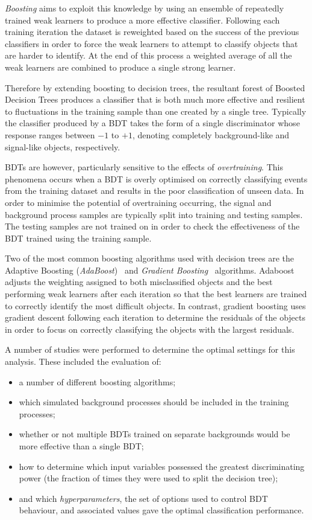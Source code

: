 \emph{Boosting} aims to exploit this knowledge by using an ensemble of repeatedly trained weak learners to produce a more effective classifier.
Following each training iteration the dataset is reweighted based on the success of the previous classifiers in order to force the weak learners to attempt to classify objects that are harder to identify.
At the end of this process a weighted average of all the weak learners are combined to produce a single strong learner.

Therefore by extending boosting to decision trees, the resultant forest of Boosted Decision Trees produces a classifier that is both much more effective and resilient to fluctuations in the training sample than one created by a single tree.
Typically the classifier produced by a BDT takes the form of a single discriminator whose response ranges between $-1$ to $+1$, denoting completely background-like and signal-like objects, respectively.

BDTs are however, particularly sensitive to the effects of \emph{overtraining}.
This phenomena occurs when a BDT is overly optimised on correctly classifying events from the training dataset and results in the poor classification of unseen data.
In order to minimise the potential of overtraining occurring, the signal and background process samples are typically split into training and testing samples.
The testing samples are not trained on in order to check the effectiveness of the BDT trained using the training sample.

Two of the most common boosting algorithms used with decision trees are the Adaptive Boosting (\emph{AdaBoost})~\cite{Friedman:additivelogistic} and \emph{Gradient Boosting}~\cite{Friedman:greedyfunction,Friedman:GradientBoosting} algorithms.
Adaboost adjusts the weighting assigned to both  misclassified objects and the best performing weak learners after each iteration so that the best learners are trained to correctly identify the most difficult objects.
In contrast, gradient boosting uses gradient descent following each iteration to determine the residuals of the objects in order to focus on correctly classifying the objects with the largest residuals.

A number of studies were performed to determine the optimal settings for this analysis.
These included the evaluation of:

\begin{itemize}
\item a number of different boosting algorithms;
\item which simulated background processes should be included in the training processes;
\item whether or not multiple BDTs trained on separate backgrounds would be more effective than a single BDT;
\item how to determine which input variables possessed the greatest discriminating power (\ie the fraction of times they were used to split the decision tree);
\item and which \emph{hyperparameters}, the set of options used to control BDT behaviour, and associated values gave the optimal classification performance.
\end{itemize}

